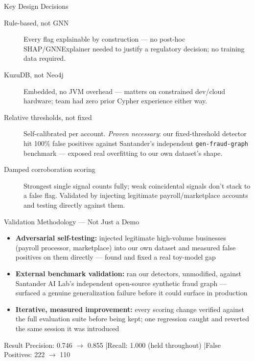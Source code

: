 \documentclass[aspectratio=169]{beamer}
\begin{document}
\begin{frame}{Key Design Decisions}
\small
\begin{description}
\item[Rule-based, not GNN] Every flag explainable by construction --- no post-hoc SHAP/GNNExplainer needed to justify a regulatory decision; no training data required.
\item[KuzuDB, not Neo4j] Embedded, no JVM overhead --- matters on constrained dev/cloud hardware; team had zero prior Cypher experience either way.
\item[Relative thresholds, not fixed] Self-calibrated per account. \emph{Proven necessary}: our fixed-threshold detector hit 100\% false positives against Santander's independent \texttt{gen-fraud-graph} benchmark --- exposed real overfitting to our own dataset's shape.
\item[Damped corroboration scoring] Strongest single signal counts fully; weak coincidental signals don't stack to a false flag. Validated by injecting legitimate payroll/marketplace accounts and testing directly against them.
\end{description}
\end{frame}

\begin{frame}{Validation Methodology --- Not Just a Demo}
\begin{itemize}
\item \textbf{Adversarial self-testing:} injected legitimate high-volume businesses (payroll processor, marketplace) into our own dataset and measured false positives on them directly --- found and fixed a real toy-model gap
\item \textbf{External benchmark validation:} ran our detectors, unmodified, against Santander AI Lab's independent open-source synthetic fraud graph --- surfaced a genuine generalization failure before it could surface in production
\item \textbf{Iterative, measured improvement:} every scoring change verified against the full evaluation suite before being kept; one regression caught and reverted the same session it was introduced
\end{itemize}

\vspace{0.5em}
\begin{block}{Result}
\centering
Precision: 0.746 $\rightarrow$ 0.855 \quad|\quad Recall: 1.000 (held throughout) \quad|\quad False Positives: 222 $\rightarrow$ 110
\end{block}
\end{frame}
\end{document}

